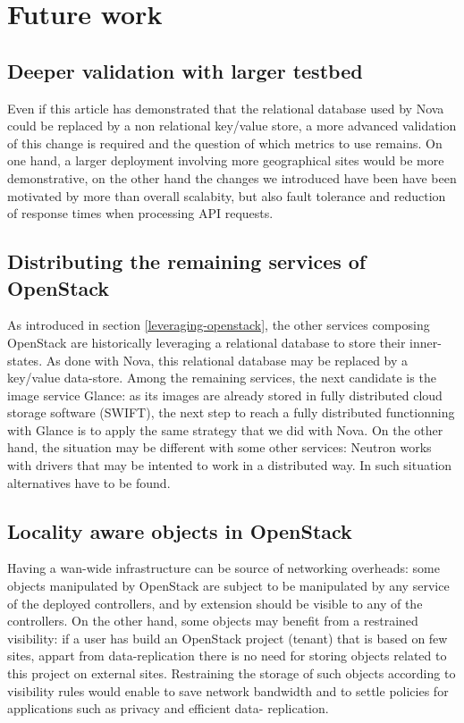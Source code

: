 \section{Future work}
\label{sec:future_work}

\subsection{Deeper validation with larger testbed}

Even if this article has demonstrated that the relational database used by Nova
could be replaced by a non relational key/value store, a more advanced
validation of this change is required and the question of which metrics to use
remains. On one hand, a larger deployment involving more geographical sites
would be more demonstrative, on the other hand the changes we introduced have
been have been motivated by more than overall scalabity, but also fault
tolerance and reduction of response times when processing API requests.

\subsection{Distributing the remaining services of OpenStack}

As introduced in section \ref{leveraging-openstack}, the other services
composing OpenStack are historically leveraging a relational database to store
their inner-states. As done with Nova, this relational database may be replaced
by a key/value data-store. Among the remaining services, the next candidate is
the image service Glance: as its images are already stored in fully distributed
cloud storage software (SWIFT), the next step to reach a fully distributed
functionning with Glance is to apply the same strategy that we did with Nova. On
the other  hand, the situation may be different with some other services:
Neutron works  with drivers that may be intented to work in a distributed way.
In such  situation alternatives have to be found.

\subsection{Locality aware objects in OpenStack}

Having a wan-wide infrastructure can be source of networking overheads: some
objects manipulated by OpenStack are subject to be manipulated by any service of
the deployed controllers, and by extension should be visible to any of the
controllers. On the other hand, some objects may benefit from a restrained
visibility: if a user has build an OpenStack project (tenant) that is based on
few sites, appart from data-replication there is no need for storing objects
related to this project on external sites. Restraining the storage of such
objects according to visibility rules would enable to save network bandwidth and
to settle policies for applications such as privacy and efficient data-
replication.
